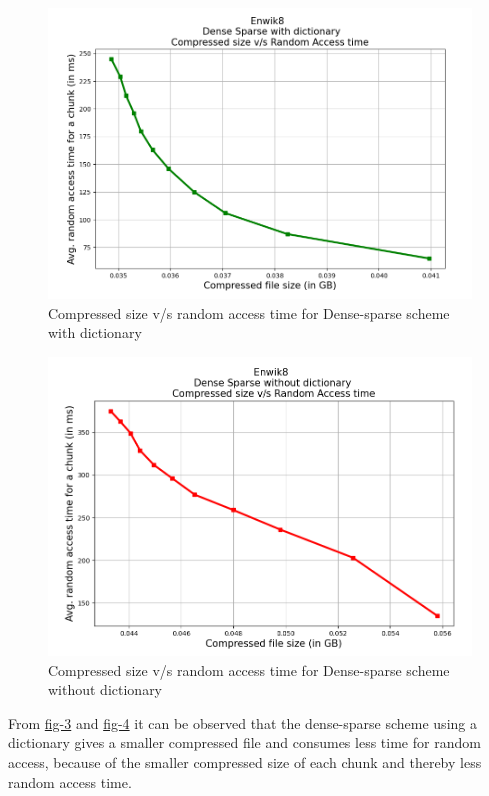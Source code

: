 \begin{figure}[H]
    \centering
    \includegraphics[width=\textwidth/2]{Figs/Enwik8_DS_dict.png}
    \caption{Compressed size v/s random access time for Dense-sparse scheme with dictionary}
    \label{fig:enwik8_ds_dict}
\end{figure}
\begin{figure}[H]
    \centering
    \includegraphics[width=\textwidth/2]{Figs/Enwik8_DS_nodict.png}
    \caption{Compressed size v/s random access time for Dense-sparse scheme without dictionary}
    \label{fig:enwik8_ds_nodict}
\end{figure}
From \href{fig:enwik8_ds_dict}{fig-3} and \href{fig:enwik8_ds_nodict}{fig-4} it can be observed that the dense-sparse scheme using a dictionary gives a smaller compressed file and consumes less time for random access, because of the smaller compressed size of each chunk and thereby less random access time.

